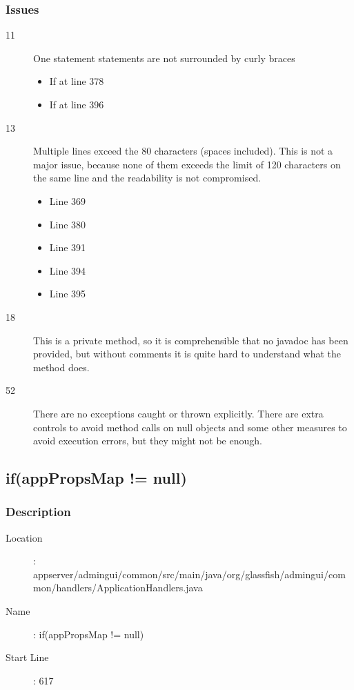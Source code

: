 		\subsubsection{Issues}
		\begin{description}
			\item[11] One statement statements are not surrounded by curly braces
				\begin{itemize}
				\item If at line 378
				\item If at line 396
				\end{itemize}
			\item[13] Multiple lines exceed the 80 characters (spaces included).
				This is not a major issue, because none of them	exceeds the limit of 120 characters on the same line and
				the readability is not compromised.
				\begin{itemize}
					\item Line 369
					\item Line 380
					\item Line 391
					\item Line 394
					\item Line 395
				\end{itemize}
			\item[18] This is a private method, so it is comprehensible that no javadoc has been provided, but
			without comments it is quite hard to understand what the method does.
			\item[52] There are no exceptions caught or thrown explicitly. There are extra controls to avoid method
			calls on null objects and some other measures to avoid execution errors, but they might not be enough.
		\end{description}
	\newpage
	\subsection{if(appPropsMap != null)}
		\subsubsection{Description}
		\begin{description}
		\item[Location]: appserver/admingui/common/src/main/java/org/glassfish/admingui/common/handlers/ApplicationHandlers.java
		\item[Name]: if(appPropsMap != null)
		\item[Start Line]: 617
		\end{description}
